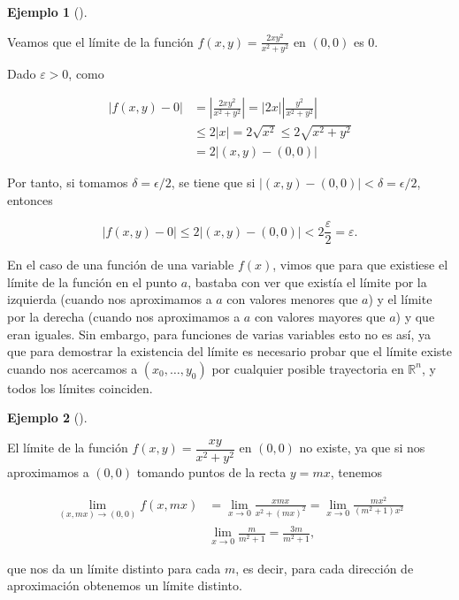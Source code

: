 \documentclass[
  a4paper,
]{scrreport}
\theoremstyle{definition}
\theoremstyle{plain}
\theoremstyle{plain}
\theoremstyle{definition}
\theoremstyle{definition}
\newtheorem{example}{Ejemplo}[chapter]
\theoremstyle{plain}
\theoremstyle{remark}
\begin{document}
\begin{example}[]\protect\hypertarget{exm-limite-funcion-dos-variables}{}\label{exm-limite-funcion-dos-variables}

Veamos que el límite de la función \(f(x,y)=\frac{2xy^2}{x^2+y^2}\) en
\((0,0)\) es \(0\).

Dado \(\varepsilon>0\), como

\begin{align*}
|f(x,y)-0| 
&= \left|\frac{2xy^2}{x^2+y^2}\right| 
= |2x|\left|\frac{y^2}{x^2+y^2}\right| \\
& \leq 2|x| 
= 2\sqrt{x^2}
\leq 2\sqrt{x^2+y^2} \\
&= 2|(x,y)-(0,0)|
\end{align*}

Por tanto, si tomamos \(\delta = \epsilon/2\), se tiene que si
\(|(x,y)-(0,0)|<\delta = \epsilon/2\), entonces

\[
|f(x,y)-0| \leq 2|(x,y)-(0,0)| < 2\frac{\varepsilon}{2} = \varepsilon.
\]

\end{example}

En el caso de una función de una variable \(f(x)\), vimos que para que
existiese el límite de la función en el punto \(a\), bastaba con ver que
existía el límite por la izquierda (cuando nos aproximamos a \(a\) con
valores menores que \(a\)) y el límite por la derecha (cuando nos
aproximamos a \(a\) con valores mayores que \(a\)) y que eran iguales.
Sin embargo, para funciones de varias variables esto no es así, ya que
para demostrar la existencia del límite es necesario probar que el
límite existe cuando nos acercamos a \((x_0,\ldots,y_0)\) por cualquier
posible trayectoria en \(\mathbb{R}^n\), y todos los límites coinciden.

\begin{example}[]\protect\hypertarget{exm-no-existencia-limite}{}\label{exm-no-existencia-limite}

El límite de la función \(f(x,y)=\dfrac{xy}{x^2+y^2}\) en \((0,0)\) no
existe, ya que si nos aproximamos a \((0,0)\) tomando puntos de la recta
\(y=mx\), tenemos

\begin{align*}
\lim_{(x,mx)\to(0,0)} f(x,mx) 
&= \lim_{x\to 0} \frac{xmx}{x^2+(mx)^2} 
= \lim_{x\to 0} \frac{mx^2}{(m^2+1)x^2} \\
& \lim_{x\to 0} \frac{m}{m^2+1} 
= \frac{3m}{m^2+1},
\end{align*}

que nos da un límite distinto para cada \(m\), es decir, para cada
dirección de aproximación obtenemos un límite distinto.

\end{example}
\end{document}
